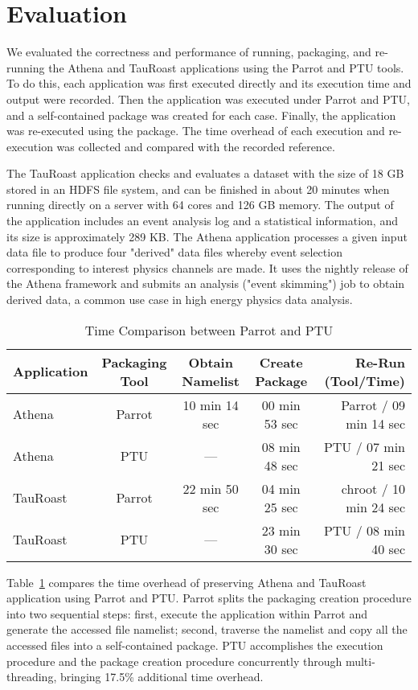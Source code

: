 \section{Evaluation}

We evaluated the correctness and performance of running, packaging, and re-running the Athena and TauRoast applications using the Parrot and PTU tools.
To do this, each application was first executed directly and its execution time and output were recorded. Then the application was executed under Parrot and PTU, and a self-contained package was created for each case. Finally, the application was re-executed using the package. The time overhead of each execution and re-execution was collected and compared with the recorded reference.

The TauRoast application checks and evaluates a dataset with the size of 18 GB stored in an HDFS file system, and can be finished in about 20 minutes when running directly on a server with 64 cores and 126 GB memory. The output of the application includes an event analysis log and a statistical information, and its size is approximately 289 KB. The Athena application processes a given input data file to produce four "derived" data files whereby event selection corresponding to interest physics channels are made. It uses the nightly release of the Athena framework and submits an analysis ("event skimming") job to obtain derived data, a common use case in high energy physics data analysis.

\begin{table}
\small
    \centering
    \begin{tabular}{lcccr}
    \hline
    \bf Application & \bf Packaging Tool & \bf Obtain Namelist & \bf Create Package & \bf Re-Run (Tool/Time)\\ \hline
	Athena & Parrot & 10 min 14 sec & 00 min 53 sec & Parrot / 09 min 14 sec  \\ \hline
	Athena & PTU & --- & 08 min 48 sec & PTU / 07 min 21 sec  \\ \hline
	TauRoast & Parrot & 22 min 50 sec  & 04 min 25 sec &chroot / 10 min 24 sec \\ \hline
	TauRoast & PTU & --- & 23 min 30 sec & PTU / 08 min 40 sec \\ \hline 
    \end{tabular}
    \normalsize
    \caption{Time Comparison between Parrot and PTU}
    \label{table:parrot_ptu}
\end{table}    

Table~\ref{table:parrot_ptu} compares the time overhead of preserving Athena and TauRoast application using Parrot and PTU.
Parrot splits the packaging creation procedure into two sequential steps: first, execute the application within Parrot and generate the accessed file namelist; second, traverse the namelist and copy all the accessed files into a self-contained package.
PTU accomplishes the execution procedure and the package creation procedure concurrently through multi-threading, bringing 17.5\% additional time overhead.

